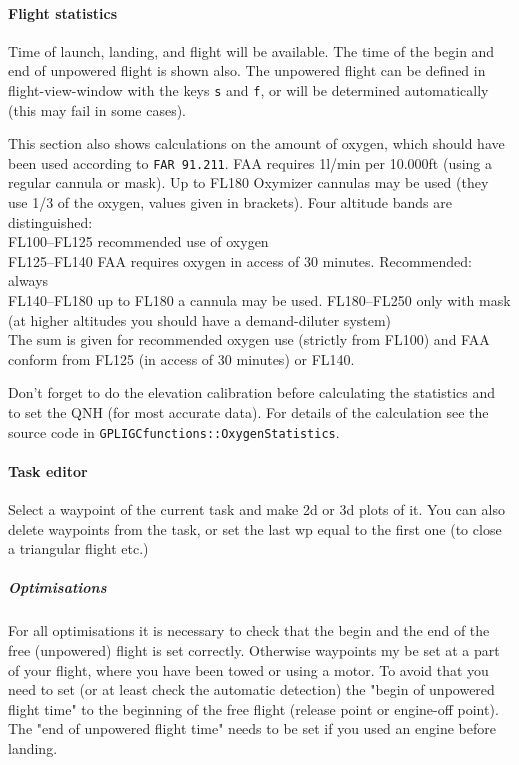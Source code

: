 \paragraph{Flight statistics}
Time of launch, landing, and flight will be available.
The time of the begin and end of unpowered flight is shown also.
The unpowered flight can be defined in flight-view-window with the keys \texttt{s} and \texttt{f}, or will be determined automatically (this may fail in some cases).

This section also shows calculations on the amount of oxygen, which should have been used according to \texttt{FAR 91.211}.
FAA requires 1l/min per 10.000ft (using a regular cannula or mask). Up to FL180 Oxymizer cannulas may be used (they use 1/3 of the oxygen, values given in brackets).
Four altitude bands are distinguished: \\
FL100--FL125 recommended use of oxygen\\
FL125--FL140 FAA requires oxygen in access of 30 minutes. Recommended: always \\
FL140--FL180 up to FL180 a cannula may be used.
FL180--FL250 only with mask (at higher altitudes you should have a demand-diluter system)\\

The sum is given for recommended oxygen use (strictly from FL100) and FAA conform from FL125 (in access of 30 minutes) or FL140.

Don't forget to do the elevation calibration before calculating the statistics and to set the QNH (for most accurate data).
For details of the calculation see the source code in \texttt{GPLIGCfunctions::OxygenStatistics}.


\paragraph{Task editor}
Select a waypoint of the current task and make 2d or 3d plots of it.
You can also delete waypoints from the task, or set the last wp equal to the first
one (to close a triangular flight etc.)


\subparagraph{Optimisations} \label{optimise} For all optimisations it is necessary to check that the begin and the end of the free (unpowered) flight is set correctly.
Otherwise waypoints my be set at a part of your flight, where you have been towed or using a motor.
To avoid that you need to set (or at least check the automatic detection) the "begin of unpowered flight time" to the beginning of the free flight (release point or engine-off point). The "end of unpowered flight time" needs to be set if you used an engine before landing.

